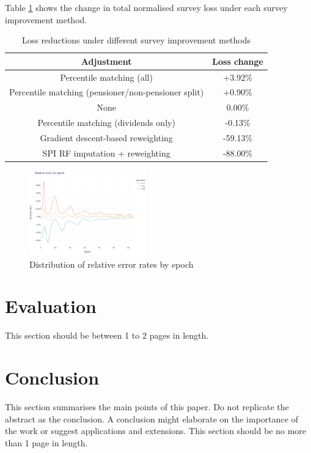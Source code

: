 \documentclass[10pt,journal,compsoc]{IEEEtran}
\begin{document}
Table \ref{tab:loss_reduction} shows the change in total normalised survey loss under each survey improvement method.

\begin{table}[!ht]
  \caption{Loss reductions under different survey improvement methods}
  \label{tab:loss_reduction}
  \centering
  \begin{tabular}{cc}
    \hline\hline
    Adjustment & Loss change \\
    \hline
    Percentile matching (all) &      +3.92\% \\
    Percentile matching (pensioner/non-pensioner split) &      +0.90\% \\
    None &       0.00\% \\
    Percentile matching (dividends only) &      -0.13\% \\
    Gradient descent-based reweighting &     -59.13\% \\
    SPI RF imputation + reweighting &     -88.00\% \\
  \hline\hline
  \end{tabular}
\end{table}


\begin{figure}[!ht]
  \centering
  \includegraphics[width=0.45\textwidth]{rel_error_training.png}
  \caption{Distribution of relative error rates by epoch}
  \label{fig:rel_error_training}
\end{figure}

\section{Evaluation}
This section should be between 1 to 2 pages in length.

\section{Conclusion}
This section summarises the main points of this paper. Do not replicate the abstract as the conclusion. A conclusion might elaborate on the importance of the work or suggest applications and extensions. This section should be no more than 1 page in length.
\end{document}
